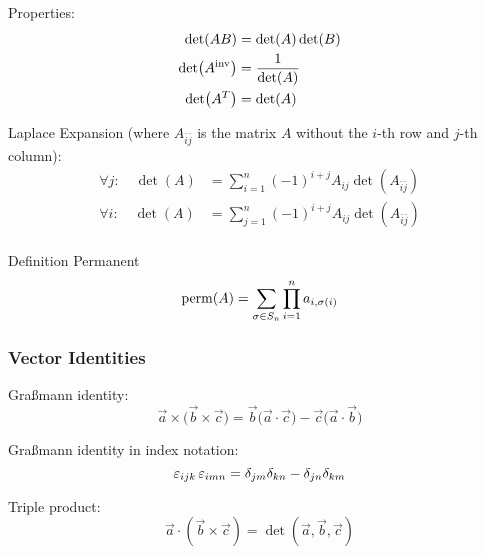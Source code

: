 			\noindent
			Properties:
			\begin{equation}
				\begin{aligned}
					\det(AB) &= \det(A)\det(B) \\
					\det({A}^\mathrm{inv}) &= \frac{1}{\det(A)} \\
					\det(A^T) &= \det(A) \\
				\end{aligned}
			\end{equation}

			\noindent
			Laplace Expansion (where $A_{\bar{i}\bar{j}}$ is the matrix $A$ without the $i$-th row and $j$-th column):
			\begin{equation}
				\begin{aligned}
					\forall j: \quad \det(A) &= \sum_{i=1}^n (-1)^{i+j}A_{ij} \det(A_{\bar{i}\bar{j}}) \\ 
					\forall i: \quad \det(A) &= \sum_{j=1}^n (-1)^{i+j}A_{ij} \det(A_{\bar{i}\bar{j}}) \\
				\end{aligned}
			\end{equation}

			\noindent
			Definition Permanent
			\begin{equation}
				\mathrm{perm}(A) = \sum_{\sigma\in S_n} \prod_{i=1}^n a_{i,\sigma(i)}
			\end{equation}

		\subsubsection{Vector Identities}
			\noindent
			Graßmann identity:
			\begin{equation}
				\vec{a}\times\big(\vec{b}\times\vec{c}\big) = \vec{b}\big(\vec{a}\cdot\vec{c}\big) - \vec{c}\big(\vec{a}\cdot\vec{b}\big)
			\end{equation}

			\noindent
			Graßmann identity in index notation:
			\begin{equation}
				\varepsilon_{ijk}\,\varepsilon_{imn}=\delta_{jm}\delta_{kn}-\delta_{jn}\delta_{km}
			\end{equation}

			\noindent
			Triple product:
			\begin{equation}
				\vec{a}\cdot\left(\vec{b}\times\vec{c}\right) = \det\left(\vec{a},\vec{b},\vec{c}\right)
			\end{equation}

